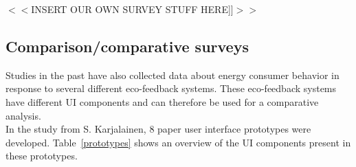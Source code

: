 \documentclass[journal]{vgtc}                %
\begin{document}
$<<$INSERT OUR OWN SURVEY STUFF HERE]]$>>$ \\



\subsection{Comparison/comparative surveys} %
Studies in the past have also collected data about energy consumer behavior in response to several different eco-feedback systems. These eco-feedback systems have different UI components and can therefore be used for a comparative analysis.\\

In the study from S. Karjalainen\cite{karjalainen2011consumer}, 8 paper user interface prototypes were developed. Table~\ref{prototypes} shows an overview of the UI components present in these prototypes.
\end{document}
